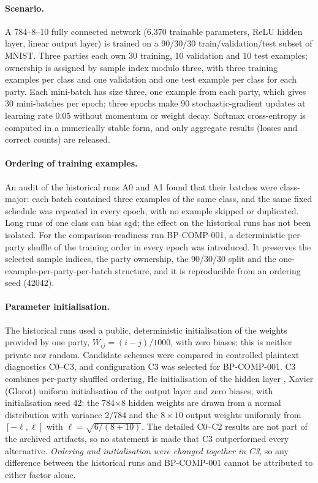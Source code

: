 \paragraph{Scenario.} A 784--8--10 fully connected network (6{,}370 trainable parameters, ReLU hidden layer, linear output layer) is trained on a 90/30/30 train/validation/test subset of MNIST. Three parties each own 30 training, 10 validation and 10 test examples; ownership is assigned by sample index modulo three, with three training examples per class and one validation and one test example per class for each party. Each mini-batch has size three, one example from each party, which gives 30 mini-batches per epoch; three epochs make 90 stochastic-gradient updates at learning rate $0.05$ without momentum or weight decay. Softmax cross-entropy is computed in a numerically stable form, and only aggregate results (losses and correct counts) are released.

\paragraph{Ordering of training examples.} An audit of the historical runs A0 and A1 found that their batches were class-major: each batch contained three examples of the same class, and the same fixed schedule was repeated in every epoch, with no example skipped or duplicated. Long runs of one class can bias \ac{sgd}; the effect on the historical runs has not been isolated. For the comparison-readiness run BP-COMP-001, a deterministic per-party shuffle of the training order in every epoch was introduced. It preserves the selected sample indices, the party ownership, the 90/30/30 split and the one-example-per-party-per-batch structure, and it is reproducible from an ordering seed (42042).

\paragraph{Parameter initialisation.} The historical runs used a public, deterministic initialisation of the weights provided by one party, $W_{ij}=(i-j)/1000$, with zero biases; this is neither private nor random. Candidate schemes were compared in controlled plaintext diagnostics C0--C3, and configuration C3 was selected for BP-COMP-001. C3 combines per-party shuffled ordering, He initialisation of the hidden layer \cite{he2015delving}, Xavier (Glorot) uniform initialisation of the output layer \cite{glorot2010understanding} and zero biases, with initialisation seed 42: the 784$\times$8 hidden weights are drawn from a normal distribution with variance $2/784$ and the $8\times10$ output weights uniformly from $[-\ell,\ell]$ with $\ell=\sqrt{6/(8+10)}$. The detailed C0--C2 results are not part of the archived artifacts, so no statement is made that C3 outperformed every alternative. \emph{Ordering and initialisation were changed together in C3}, so any difference between the historical runs and BP-COMP-001 cannot be attributed to either factor alone.

